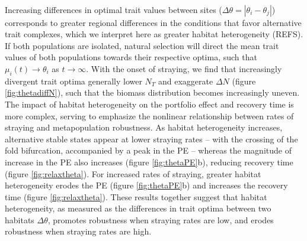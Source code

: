 \documentclass[twocolumn,preprintnumbers,amsmath,amssymb,superscriptaddress]{revtex4}
\begin{document}
\\ 
\noindent Increasing differences in optimal trait values between sites ($\Delta\theta = \left|\theta_i - \theta_j\right|$) corresponds to greater regional differences in the conditions that favor alternative trait complexes, which we interpret here as greater habitat heterogeneity (REFS).
If both populations are isolated, natural selection will direct the mean trait values of both populations towards their respective optima, such that $\mu_i(t) \rightarrow \theta_i$ as $t\rightarrow\infty$.
With the onset of straying, we find that increasingly divergent trait optima generally lower $N_T$ and exaggerate $\Delta N$ (figure \ref{fig:thetadiffN}), such that the biomass distribution becomes increasingly uneven. %
The impact of habitat heterogeneity on the portfolio effect and recovery time is more complex, serving to emphasize the nonlinear relationship between rates of straying and metapopulation robustness. %
As habitat heterogeneity increases, alternative stable states appear at lower straying rates -- with the crossing of the fold bifurcation, accompanied by a peak in the PE -- whereas the magnitude of increase in the PE also increases (figure \ref{fig:thetaPE}b), reducing recovery time (figure \ref{fig:relaxtheta}).
For increased rates of straying, greater habitat heterogeneity erodes the PE (figure \ref{fig:thetaPE}b) and increases the recovery time (figure \ref{fig:relaxtheta}).
These results together suggest that habitat heterogeneity, as measured as the differences in trait optima between two habitats $\Delta\theta$, promotes robustness when straying rates are low, and erodes robustness when straying rates are high.
\\
\end{document}
